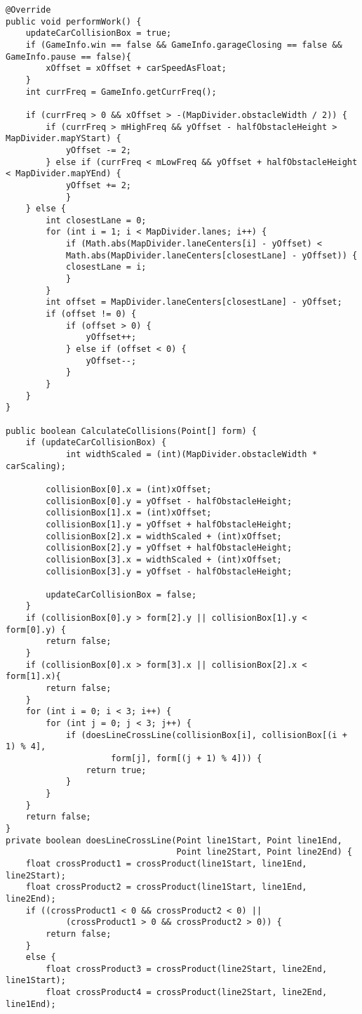 \begin{lstlisting}[style=csharp,label=car_class, caption={Run method from the original Cars project.}]
@Override
public void performWork() {
	updateCarCollisionBox = true;
	if (GameInfo.win == false && GameInfo.garageClosing == false && GameInfo.pause == false){
		xOffset = xOffset + carSpeedAsFloat;
	}
	int currFreq = GameInfo.getCurrFreq();
		
	if (currFreq > 0 && xOffset > -(MapDivider.obstacleWidth / 2)) {
		if (currFreq > mHighFreq && yOffset - halfObstacleHeight > MapDivider.mapYStart) {
			yOffset -= 2;
		} else if (currFreq < mLowFreq && yOffset + halfObstacleHeight < MapDivider.mapYEnd) {
			yOffset += 2;
			}
 	} else {
 		int closestLane = 0;
 		for (int i = 1; i < MapDivider.lanes; i++) {
 			if (Math.abs(MapDivider.laneCenters[i] - yOffset) <
 			Math.abs(MapDivider.laneCenters[closestLane] - yOffset)) {
 			closestLane = i;
 			}
 		}
 		int offset = MapDivider.laneCenters[closestLane] - yOffset;
		if (offset != 0) {
			if (offset > 0) {
				yOffset++;
			} else if (offset < 0) {
				yOffset--;
			}
		}
	}
}
		
public boolean CalculateCollisions(Point[] form) {
	if (updateCarCollisionBox) {
			int widthScaled = (int)(MapDivider.obstacleWidth * carScaling);
			
		collisionBox[0].x = (int)xOffset;
		collisionBox[0].y = yOffset - halfObstacleHeight;
		collisionBox[1].x = (int)xOffset;
		collisionBox[1].y = yOffset + halfObstacleHeight;
		collisionBox[2].x = widthScaled + (int)xOffset;
		collisionBox[2].y = yOffset + halfObstacleHeight;
		collisionBox[3].x = widthScaled + (int)xOffset;
		collisionBox[3].y = yOffset - halfObstacleHeight;
		
		updateCarCollisionBox = false;
	}
	if (collisionBox[0].y > form[2].y || collisionBox[1].y < form[0].y) {
		return false;
	}
	if (collisionBox[0].x > form[3].x || collisionBox[2].x < form[1].x){
		return false;
	}		
	for (int i = 0; i < 3; i++) {
		for (int j = 0; j < 3; j++) {
			if (doesLineCrossLine(collisionBox[i], collisionBox[(i + 1) % 4],
					 form[j], form[(j + 1) % 4])) {
				return true;
			}
		}
	}		
	return false;
}
private boolean doesLineCrossLine(Point line1Start, Point line1End,
								  Point line2Start, Point line2End) {
	float crossProduct1 = crossProduct(line1Start, line1End, line2Start);
	float crossProduct2 = crossProduct(line1Start, line1End, line2End);
	if ((crossProduct1 < 0 && crossProduct2 < 0) ||
			(crossProduct1 > 0 && crossProduct2 > 0)) {
		return false;
	}
	else {
		float crossProduct3 = crossProduct(line2Start, line2End, line1Start);
		float crossProduct4 = crossProduct(line2Start, line2End, line1End);
			

\end{lstlisting}
